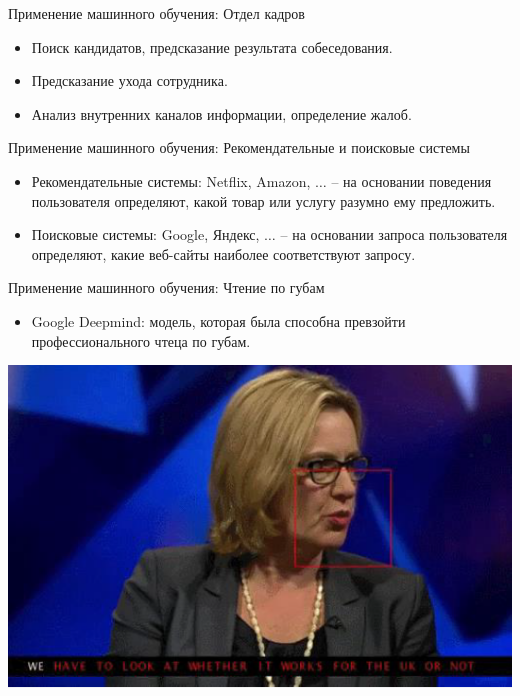 \documentclass[c, handout]{beamer} %
\begin{document}
 	\begin{frame}{Применение машинного обучения: Отдел кадров}
 		\begin{itemize}
 			\item Поиск кандидатов, предсказание результата собеседования.
 			\item Предсказание ухода сотрудника.
 			\item Анализ внутренних каналов информации, определение жалоб.
 		\end{itemize}
 	\end{frame}
	
	\begin{frame}{Применение машинного обучения: Рекомендательные и поисковые системы}
		\begin{itemize}
			\item Рекомендательные системы: Netflix, Amazon, $\ldots$ – на основании поведения пользователя определяют, какой товар или услугу разумно ему предложить. 
			\item Поисковые системы: Google, Яндекс, $\ldots$ – на основании запроса пользователя определяют, какие веб-сайты наиболее соответствуют запросу.  
		\end{itemize}		
	\end{frame}

	\begin{frame}{Применение машинного обучения: Чтение по губам}
		\begin{itemize}
			\item Google Deepmind: модель, которая была способна превзойти профессионального чтеца по губам.
		\end{itemize}
		\begin{center}
			\href{https://www.newscientist.com/article/2113299-googles-deepmind-ai-can-lip-read-tv-shows-better-than-a-pro/}{\includegraphics[width=0.9\linewidth]{dm.png}}
		\end{center}
	\end{frame}
\end{document}
